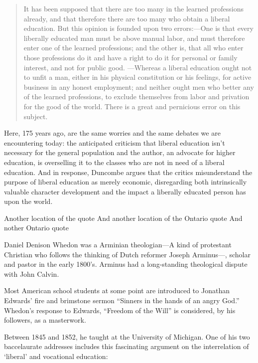 \begin{quote}

It has been supposed that there are too many in the learned professions already, and that therefore there are too many who obtain a liberal education. But this opinion is founded upon two errors:---One is that every liberally educated man must be above manual labor, and must therefore enter one of the learned professions; and the other is, that all who enter those professions do it and have a right to do it for personal or family interest, and not for public good. ---Whereas a liberal education ought not to unfit a man, either in his physical constitution or his feelings, for active business in any honest employment; and neither ought men who better any of the learned professions, to exclude themselves from labor and privation for the good of the world. There is a great and pernicious error on this subject. ~\citep{Duncombe:1855wx}
\end{quote}

Here, 175 years ago, are the same worries and the same debates we are encountering today: the anticipated criticism that liberal education isn't necessary for the general population and the author, an advocate for higher education, is overselling it to the classes who are not in need of a liberal education. And in response, Duncombe argues that the critics misunderstand the purpose of liberal education as merely economic, disregarding both intrinsically valuable character development and the impact a liberally educated person has upon the world. 

Another location of the quote
And another location of the Ontario quote
And nother Ontario quote

Daniel Denison Whedon was a Arminian theologian---A kind of protestant Christian who follows the thinking of Dutch reformer Joseph Arminus---, scholar and pastor in the early 1800's. Arminus had a long-standing theological dispute with John Calvin. 

Most American school students at some point are introduced to Jonathan Edwards' fire and brimstone sermon ``Sinners in the hands of an angry God.'' Whedon's response to Edwards, ``Freedom of the Will'' is considered, by his followers, as a masterwork.

Between 1845 and 1852, he taught at the University of Michigan. One of his two baccelaurate addresses includes this fascinating argument on the interrelation of `liberal' and vocational education:

